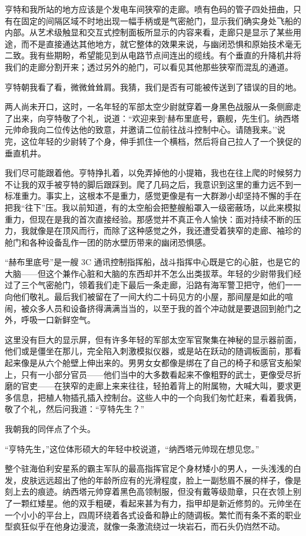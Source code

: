 \documentclass[AutoFakeBold=true]{book}
\begin{document}
亨特和我所站的地方应该是个发电车间狭窄的走廊。喷有色码的管子四处扭曲，只有在固定的间隔区域不时地出现一幅手柄或是气密舱门，显示我们确实身处飞船的内部。从艺术级触显和交互式控制面板所显示的内容来看，走廊只是显示了某些用途，而不是直接通达其他地方，就它整体的效果来说，与幽闭恐惧和原始技术毫无二致。我有些期盼，希望能见到从电路节点间连出的缆线。有个垂直的升降机井将我们的走廊分割开来；透过另外的舱门，可以看见其他那些狭窄而混乱的通道。

亨特朝我看了看，微微耸耸肩。我猜，我们是否有可能被传送到了错误的目的地。

两人尚未开口，这时，一名年轻的军部太空少尉就穿着一身黑色战服从一条侧廊走了出来，向亨特敬了个礼，说道：``欢迎来到`赫布里底号，霸舰，先生们。纳西塔元帅命我向二位传达他的致意，并邀请二位前往战斗控制中心。请随我来。''说完，这位年轻的少尉转了个身，伸手抓住一个横档，然后将自己拉人了一个狭促的垂直机井。

我们尽可能跟着他。亨特挣扎着，以免弄掉他的小提箱，我也在往上爬的时候努力不让我的双手被亨特的脚后跟踩到。爬了几码之后，我意识到这里的重力远不到一标准重力。事实上，这根本不是重力，感觉更像是有一大群渺小却坚持不懈的手在把我``往下''压。我以前知道，有的太空船会把整艘船罩入一级密蔽场，以此来模拟重力，但现在是我的首次直接经验。那感觉并不真正令人愉快：面对持续不断的压力，我就像是在顶风而行，而除了这种感觉之外，我还遭受着狭窄的走廊、袖珍的舱门和各种设备乱作一团的防水壁历带来的幽闭恐惧感。

``赫布里底号''是一艘 3C 通讯控制指挥船，战斗指挥中心既是它的心脏，也是它的大脑——但这个兼作心脏和大脑的东西却并不怎么出类拔萃。年轻的少尉带我们经过了三个气密舱门，领着我们走下最后一条走廊，沿路有海军警卫把守，他们一一向他们敬礼。最后我们被留在了一间大约二十码见方的小屋，那间屋是如此的喧闹，被众多人员和设备挤得满满当当的，以至于我的首个冲动就是要退回到舱门之外，呼吸一口新鲜空气。

这里没有巨大的显示屏，但有许多年轻的军部太空军官聚集在神秘的显示器前面，他们或是僵坐在那儿，完全陷入刺激模拟仪器，或是站在跃动的随调板面前，那看起来像是从六个舱壁上伸出来的。男男女女都像是绑在了自己的椅子和感官支船架上，只有一小部分官员——他们当中的大多数看起来不像粗野的武士，更像受尽折磨的官吏——在狭窄的走廊上来来往往，轻拍着背上的附属物，大喊大叫，要求更多信息，把植人物插孔插入控制台。这些人中的一个向我们匆忙赶来，看着我俩，敬了个礼，然后问我道：``亨特先生？''

我朝我的同伴点了个头。

``亨特先生，''这位体形硕大的年轻中校说道，``纳西塔元帅现在想见您。''

整个驻海伯利安星系的霸主军队的最高指挥官足个身材矮小的男人，一头浅浅的白发，皮肤远远超出了他的年龄所应有的光滑程度，脸上一副愁眉不展的样子，像是刻上去的痕迹。纳西塔元帅穿着黑色高领制服，但没有戴等级勋章，只在衣领上别了一颗红矮星。他的双手粗硬，看起来甚为有力，指甲却是新近修剪的。元帅坐在一个小小的平台上，四周环绕着各式设备和静止的随调板。繁忙而有条不紊的职业型疯狂似乎在他身边漫流，就像一条激流绕过一块岩石，而石头仍岿然不动。
\end{document}
